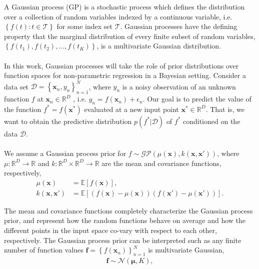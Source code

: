 \documentclass[]{interact}
\theoremstyle{plain}%
\theoremstyle{definition}
\theoremstyle{remark}
\begin{document}
A Gaussian process (GP) is a stochastic process which defines the distribution over a collection of random variables indexed by a continuous variable, i.e. $\left\lbrace f(t): t \in \mathcal{T}\right\rbrace$ for some index set $\mathcal{T}$. Gaussian processes have the defining property that the marginal distribution of every finite subset of random variables, $\left\lbrace f(t_1), f(t_2), \hdots, f(t_K) \right\rbrace$, is a multivariate Gaussian distribution.
\\
\\
In this work, Gaussian processes will take the role of prior distributions over function spaces for non-parametric regression in a Bayesian setting. 
Consider a data set $\mathcal{D} = \left\lbrace \mathbf{x}_n, y_n \right\rbrace_{n=1}^N$, where $y_n$ is a noisy observation of an unknown function $f$ at $\mathbf{x}_n \in \mathbb{R}^D$ , i.e. $y_n = f(\mathbf{x}_n) + \epsilon_n$. Our goal is to predict the value of the function $f^*=f(\mathbf{x}^*)$ evaluated at a new input point $\mathbf{x}^* \in \mathbb{R}^D$. That is, we want to obtain the predictive distribution $p(f^*|\mathcal{D})$ of $f^*$ conditioned on the data $\mathcal{D}$.
\\
\\
We assume a Gaussian process prior for $f \sim \mathcal{GP}(\mu(\mathbf{x}), k(\mathbf{x}, \mathbf{x}'))$, where $\mu: \mathbb{R}^D \rightarrow \mathbb{R}$ and $k: \mathbb{R}^D \times \mathbb{R}^D \rightarrow \mathbb{R}$ are the mean and covariance functions, respectively,
%
\begin{align*}
 	\mu(\mathbf{x}) &= \mathbb{E}\!\left[f(\mathbf{x})\right],\\ 
 	k(\mathbf{x}, \mathbf{x}') &= \mathbb{E}\!\left[\left( f(\mathbf{x}) - \mu(\mathbf{x}) \right)\left( f(\mathbf{x}') - \mu(\mathbf{x}') \right)\right].
\end{align*} 

The mean and covariance functions completely characterize the Gaussian process prior, and represent how the random functions behave on average and how the different points in the input space co-vary with respect to each other, respectively. The Gaussian process prior can be interpreted such as any finite number of function values $\mathbf{f}=\left\lbrace f(\mathbf{x}_n) \right\rbrace_{n=1}^N$ is multivariate Gaussian, 
\begin{align*}
\mathbf{f} \sim \mathcal{N}(\boldsymbol{\mu},K),
\end{align*}
\end{document}
